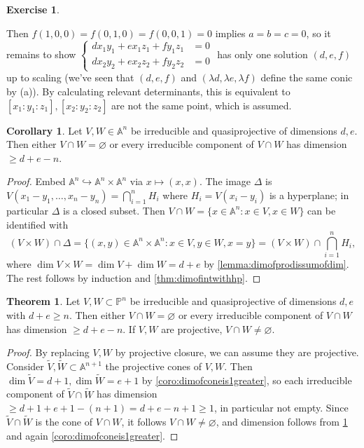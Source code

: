 \documentclass{article}
\newcommand{\A}{\mathbb{A}}
\newcommand{\p}{\mathbb{P}}
\theoremstyle{definition}
\newtheorem{thm}[defn]{Theorem}
\newtheorem{coro}[defn]{Corollary}
\newtheorem{exe}[defn]{Exercise}
\begin{document}
\begin{exe}
\begin{enumerate}
\begin{enumerate}
\begin{enumerate}
Then $f(1,0,0)=f(0,1,0)=f(0,0,1)=0$ implies $a=b=c=0$, so it remains to show $\left\{\begin{aligned}
dx_1y_1+ex_1z_1+fy_1z_1&=0 \\ dx_2y_2+ex_2z_2+fy_2z_2&=0
\end{aligned} \right.$ has only one solution $(d,e,f)$ up to scaling (we've seen that $(d,e,f)$ and $(\lambda d,\lambda e,\lambda f)$ define the same conic by (a)). By calculating relevant determinants, this is equivalent to $[x_1:y_1:z_1],[x_2:y_2:z_2]$ are not the same point, which is assumed.
\end{enumerate}
\end{enumerate}
\end{enumerate}
\end{exe}

\begin{coro}
\label{coro:affineintdim}
Let $V,W\in\A^n$ be irreducible and quasiprojective of dimensions $d,e$. Then either $V\cap W=\varnothing$ or every irreducible component of $V\cap W$ has dimension $\geq d+e-n$.
\end{coro}
\begin{proof}
Embed $\A^n\hookrightarrow\A^n\times\A^n$ via $x\mapsto (x,x)$. The image $\Delta$ is $V(x_1-y_1,\ldots,x_n-y_n)=\bigcap_{i=1}^n H_i$ where $H_i=V(x_i-y_i)$ is a hyperplane; in particular $\Delta$ is a closed subset. Then $V\cap W=\{x\in\A^n:x\in V,x\in W\}$ can be identified with
\[
(V\times W)\cap\Delta=\{(x,y)\in\A^n\times\A^n:x\in V,y\in W,x=y\}=(V\times W)\cap\bigcap_{i=1}^n H_i,
\]
where $\dim V\times W=\dim V+\dim W=d+e$ by \ref{lemma:dimofprodissumofdim}. The rest follows by induction and \ref{thm:dimofintwithhp}.
\end{proof}

\begin{thm}
Let $V,W\subset\p^n$ be irreducible and quasiprojective of dimensions $d,e$ with $d+e\geq n$. Then either $V\cap W=\varnothing$ or every irreducible component of $V\cap W$ has dimension $\geq d+e-n$. If $V,W$ are projective, $V\cap W\neq\varnothing$.
\end{thm}
\begin{proof}
By replacing $V,W$ by projective closure, we can assume they are projective. Consider $\widetilde V,\widetilde W\subset\A^{n+1}$ the projective cones of $V,W$. Then $\dim\widetilde V=d+1,\dim\widetilde W=e+1$ by \ref{coro:dimofconeis1greater}, so each irreducible component of $\widetilde V\cap\widetilde W$ has dimension $\geq d+1+e+1-(n+1)=d+e-n+1\geq 1$, in particular not empty. Since $\widetilde V\cap\widetilde W$ is the cone of $V\cap W$, it follows $V\cap W\neq\varnothing$, and dimension follows from \ref{coro:affineintdim} and again \ref{coro:dimofconeis1greater}.
\end{proof}
\end{document}
